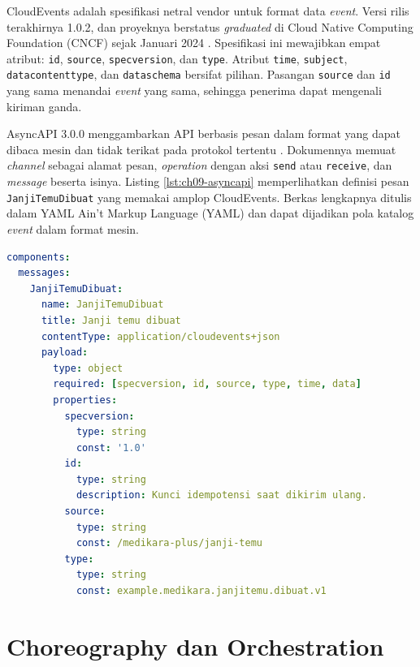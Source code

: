 \begin{pendalaman}[title={Pendalaman Teknis (opsional): CloudEvents dan AsyncAPI}]
  CloudEvents adalah spesifikasi netral vendor untuk format data \textit{event}. Versi rilis
  terakhirnya 1.0.2, dan proyeknya berstatus \textit{graduated} di Cloud Native Computing
  Foundation (CNCF) sejak Januari 2024 \cite{c09-cloudevents}. Spesifikasi ini mewajibkan empat
  atribut: \texttt{id}, \texttt{source}, \texttt{specversion}, dan \texttt{type}. Atribut
  \texttt{time}, \texttt{subject}, \texttt{datacontenttype}, dan \texttt{dataschema} bersifat
  pilihan. Pasangan \texttt{source} dan \texttt{id} yang sama menandai \textit{event} yang sama,
  sehingga penerima dapat mengenali kiriman ganda.

  AsyncAPI 3.0.0 menggambarkan API berbasis pesan dalam format yang dapat dibaca mesin dan tidak
  terikat pada protokol tertentu \cite{c09-asyncapi}. Dokumennya memuat \textit{channel} sebagai
  alamat pesan, \textit{operation} dengan aksi \texttt{send} atau \texttt{receive}, dan
  \textit{message} beserta isinya. Listing \ref{lst:ch09-asyncapi} memperlihatkan definisi pesan
  \texttt{JanjiTemuDibuat} yang memakai amplop CloudEvents. Berkas lengkapnya ditulis dalam YAML
  Ain't Markup Language (YAML) dan dapat dijadikan pola katalog \textit{event} dalam format mesin.

\begin{lstlisting}[language=yaml, captionpos=b, xleftmargin=1.6em,
  caption={Definisi pesan \texttt{JanjiTemuDibuat} dalam AsyncAPI, tersedia di \berkas{sources/chapter09/asyncapi-janji-temu.yaml}},
  label={lst:ch09-asyncapi}]
components:
  messages:
    JanjiTemuDibuat:
      name: JanjiTemuDibuat
      title: Janji temu dibuat
      contentType: application/cloudevents+json
      payload:
        type: object
        required: [specversion, id, source, type, time, data]
        properties:
          specversion:
            type: string
            const: '1.0'
          id:
            type: string
            description: Kunci idempotensi saat dikirim ulang.
          source:
            type: string
            const: /medikara-plus/janji-temu
          type:
            type: string
            const: example.medikara.janjitemu.dibuat.v1
\end{lstlisting}
\end{pendalaman}

\section{Choreography dan Orchestration}
\label{sec:ch09-koordinasi}


